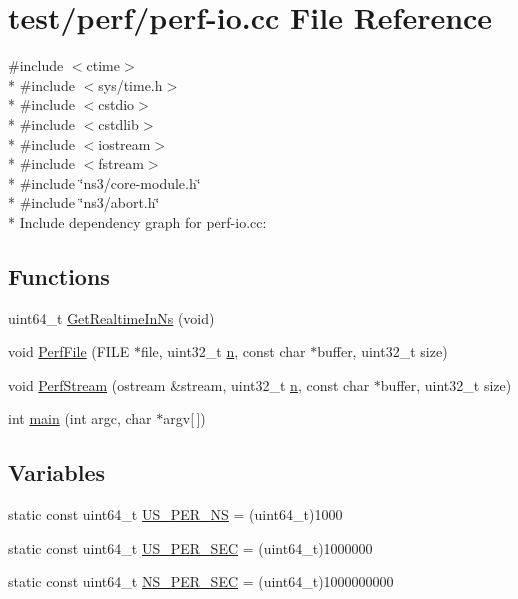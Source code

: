 \hypertarget{perf-io_8cc}{}\section{test/perf/perf-\/io.cc File Reference}
\label{perf-io_8cc}
{\ttfamily \#include $<$ctime$>$}\\*
{\ttfamily \#include $<$sys/time.\+h$>$}\\*
{\ttfamily \#include $<$cstdio$>$}\\*
{\ttfamily \#include $<$cstdlib$>$}\\*
{\ttfamily \#include $<$iostream$>$}\\*
{\ttfamily \#include $<$fstream$>$}\\*
{\ttfamily \#include \char`\"{}ns3/core-\/module.\+h\char`\"{}}\\*
{\ttfamily \#include \char`\"{}ns3/abort.\+h\char`\"{}}\\*
Include dependency graph for perf-\/io.cc\+:
\subsection*{Functions}
\begin{DoxyCompactItemize}
\item 
uint64\+\_\+t \hyperlink{perf-io_8cc_af641cbb1b31d6238aa887f2bea43864b}{Get\+Realtime\+In\+Ns} (void)
\item 
void \hyperlink{perf-io_8cc_a0f69b54561b690d3307a394602cbbc87}{Perf\+File} (F\+I\+LE $\ast$file, uint32\+\_\+t \hyperlink{lte__link__budget__x2__handover__measures_8m_abdb05bc5a064cf642a06c83b3392f148}{n}, const char $\ast$buffer, uint32\+\_\+t size)
\item 
void \hyperlink{perf-io_8cc_a56edeee167f06792d972f3801d12b6c9}{Perf\+Stream} (ostream \&stream, uint32\+\_\+t \hyperlink{lte__link__budget__x2__handover__measures_8m_abdb05bc5a064cf642a06c83b3392f148}{n}, const char $\ast$buffer, uint32\+\_\+t size)
\item 
int \hyperlink{perf-io_8cc_a0ddf1224851353fc92bfbff6f499fa97}{main} (int argc, char $\ast$argv\mbox{[}$\,$\mbox{]})
\end{DoxyCompactItemize}
\subsection*{Variables}
\begin{DoxyCompactItemize}
\item 
static const uint64\+\_\+t \hyperlink{perf-io_8cc_a68163ff157df4ce1da3deb9c8e8caf0a}{U\+S\+\_\+\+P\+E\+R\+\_\+\+NS} = (uint64\+\_\+t)1000
\item 
static const uint64\+\_\+t \hyperlink{perf-io_8cc_ae9bec129e5ccb16d3354f8c86275ddce}{U\+S\+\_\+\+P\+E\+R\+\_\+\+S\+EC} = (uint64\+\_\+t)1000000
\item 
static const uint64\+\_\+t \hyperlink{perf-io_8cc_a479bcca5923196d202ddc97a0c52ccfc}{N\+S\+\_\+\+P\+E\+R\+\_\+\+S\+EC} = (uint64\+\_\+t)1000000000
\end{DoxyCompactItemize}


